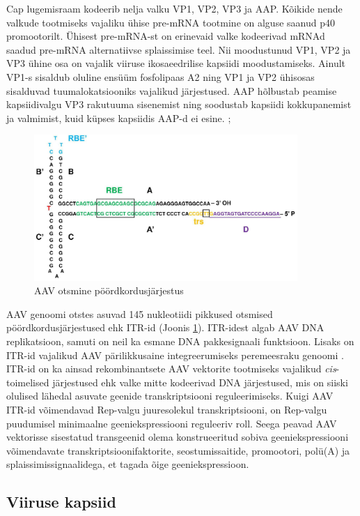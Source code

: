 \documentclass{trkut}%
\begin{document}
Cap lugemisraam kodeerib nelja valku VP1, VP2, VP3 ja AAP. Kõikide nende valkude tootmiseks vajaliku ühise pre-mRNA tootmine on alguse saanud p40 promootorilt. Ühisest pre-mRNA-st on erinevaid valke kodeerivad mRNAd saadud pre-mRNA alternatiivse splaissimise teel. Nii moodustunud VP1, VP2 ja VP3 ühine osa on vajalik viiruse ikosaeedrilise kapsiidi moodustamiseks. Ainult VP1-s sisaldub oluline ensüüm fosfolipaas A2 ning VP1 ja VP2 ühisosas sisalduvad tuumalokatsiooniks vajalikud järjestused. AAP hõlbustab peamise kapsiidivalgu VP3 rakutuuma sisenemist ning soodustab kapsiidi kokkupanemist ja valmimist, kuid küpses kapsiidis AAP-d ei esine. \parencite{samulski}; \parencite{nature_aav}
 
\begin{figure}[htbp]
	\includegraphics[width=10cm]{itr.jpg}
	\caption{AAV otsmine pöördkordusjärjestus}
	\label{itr}
\end{figure}
 
AAV genoomi otstes asuvad 145 nukleotiidi pikkused otsmised pöördkordusjärjestused ehk ITR-id (Joonis \ref{itr}). ITR-idest algab AAV DNA replikatsioon, samuti on neil ka esmane DNA pakkesignaali funktsioon. Lisaks on ITR-id vajalikud AAV pärilikkusaine integreerumiseks peremeesraku genoomi \parencite{itrmod}. ITR-id on ka ainsad rekombinantsete AAV vektorite tootmiseks vajalikud \textit{cis}-toimelised järjestused ehk valke mitte kodeerivad DNA järjestused, mis on siiski olulised lähedal asuvate geenide transkriptsiooni reguleerimiseks. Kuigi AAV ITR-id võimendavad Rep-valgu juuresolekul transkriptsiooni, on Rep-valgu puudumisel minimaalne geeniekspressiooni reguleeriv roll. Seega peavad AAV vektorisse sisestatud transgeenid olema konstrueeritud sobiva geeniekspressiooni võimendavate transkriptsioonifaktorite, seostumissaitide, promootori, polü(A) ja splaissimissignaalidega, et tagada õige geeniekspressioon. \parencite{samulski}
 
\subsection{Viiruse kapsiid}
\end{document}
